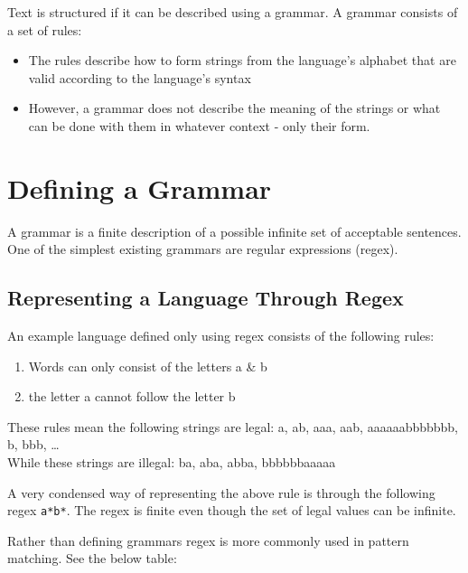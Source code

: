 \documentclass[
]{book}
\providecommand{\tightlist}{%
  \setlength{\itemsep}{0pt}\setlength{\parskip}{0pt}}
\begin{document}
Text is structured if it can be described using a grammar. A grammar consists of a set of rules:

\begin{itemize}
\tightlist
\item
  The rules describe how to form strings from the language's alphabet that are valid according to the language's syntax
\item
  However, a grammar does not describe the meaning of the strings or what can be done with them in whatever context - only their form.
\end{itemize}

\hypertarget{defining-a-grammar}{%
\section{Defining a Grammar}\label{defining-a-grammar}}

A grammar is a finite description of a possible infinite set of acceptable sentences. One of the simplest existing grammars are regular expressions (regex).

\hypertarget{representing-a-language-through-regex}{%
\subsection{Representing a Language Through Regex}\label{representing-a-language-through-regex}}

An example language defined only using regex consists of the following rules:

\begin{enumerate}
\def\labelenumi{\arabic{enumi}.}
\tightlist
\item
  Words can only consist of the letters a \& b
\item
  the letter a cannot follow the letter b
\end{enumerate}

These rules mean the following strings are {legal}: a, ab, aaa, aab, aaaaaabbbbbbb, b, bbb, \ldots{}\\
While these strings are {illegal}: ba, aba, abba, bbbbbbaaaaa

A very condensed way of representing the above rule is through the following regex \texttt{a*b*}. The regex is finite even though the set of legal values can be infinite.

Rather than defining grammars regex is more commonly used in pattern matching. See the below table:
\end{document}
